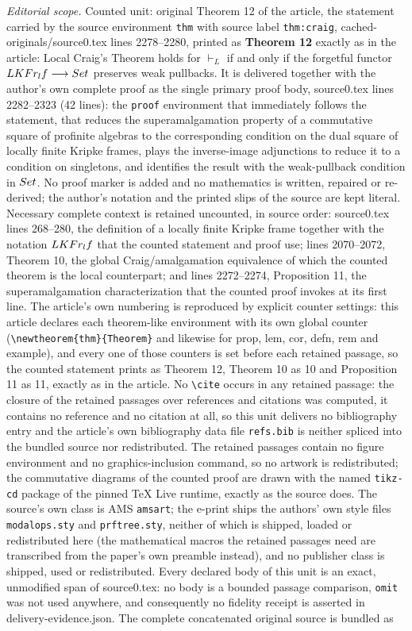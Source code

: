 \documentclass[10pt,a4paper]{amsart}
\theoremstyle{definition}
\newcommand{\KFr}{\textup{\textbf{KFr}}}
\newcommand{\lf}{\textit{lf}}
\newcommand{\Set}{\textup{\textbf{Set}}}
\begin{document}
\noindent\textit{Editorial scope.} Counted unit: original Theorem 12 of the article, the statement carried by the source environment \texttt{thm} with source label \texttt{thm:craig}, cached-originals/source0.tex lines 2278--2280, printed as \textbf{Theorem 12} exactly as in the article: Local Craig's Theorem holds for $\vdash_L$ if and only if the forgetful functor $L\KFr_\lf\longrightarrow\Set$ preserves weak pullbacks. It is delivered together with the author's own complete proof as the single primary proof body, source0.tex lines 2282--2323 (42 lines): the \texttt{proof} environment that immediately follows the statement, that reduces the superamalgamation property of a commutative square of profinite algebras to the corresponding condition on the dual square of locally finite Kripke frames, plays the inverse-image adjunctions to reduce it to a condition on singletons, and identifies the result with the weak-pullback condition in $\Set$. No proof marker is added and no mathematics is written, repaired or re-derived; the author's notation and the printed slips of the source are kept literal. Necessary complete context is retained uncounted, in source order: source0.tex lines 268--280, the definition of a locally finite Kripke frame together with the notation $L\KFr_\lf$ that the counted statement and proof use; lines 2070--2072, Theorem 10, the global Craig/amalgamation equivalence of which the counted theorem is the local counterpart; and lines 2272--2274, Proposition 11, the superamalgamation characterization that the counted proof invokes at its first line. The article's own numbering is reproduced by explicit counter settings: this article declares each theorem-like environment with its own global counter (\texttt{\textbackslash newtheorem\{thm\}\{Theorem\}} and likewise for prop, lem, cor, defn, rem and example), and every one of those counters is set before each retained passage, so the counted statement prints as Theorem 12, Theorem 10 as 10 and Proposition 11 as 11, exactly as in the article. No \texttt{\textbackslash cite} occurs in any retained passage: the closure of the retained passages over references and citations was computed, it contains no reference and no citation at all, so this unit delivers no bibliography entry and the article's own bibliography data file \texttt{refs.bib} is neither spliced into the bundled source nor redistributed. The retained passages contain no figure environment and no graphics-inclusion command, so no artwork is redistributed; the commutative diagrams of the counted proof are drawn with the named \texttt{tikz-cd} package of the pinned TeX Live runtime, exactly as the source does. The source's own class is AMS \texttt{amsart}; the e-print ships the authors' own style files \texttt{modalops.sty} and \texttt{prftree.sty}, neither of which is shipped, loaded or redistributed here (the mathematical macros the retained passages need are transcribed from the paper's own preamble instead), and no publisher class is shipped, used or redistributed. Every declared body of this unit is an exact, unmodified span of source0.tex: no body is a bounded passage comparison, \texttt{omit} was not used anywhere, and consequently no fidelity receipt is asserted in delivery-evidence.json. The complete concatenated original source is bundled as 
\end{document}
